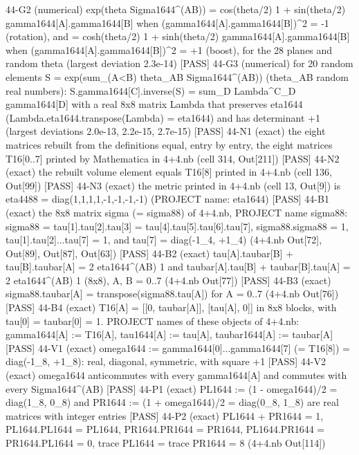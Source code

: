 \documentclass[
  10pt,
]{article}
\newenvironment{Shaded}{}{}
\newcommand{\NormalTok}[1]{#1}
\begin{document}
\begin{Shaded}
\begin{Highlighting}[]
\NormalTok{[PASS] 44{-}G2  (numerical) exp(theta Sigma1644\^{}(AB)) = cos(theta/2) 1 + sin(theta/2) gamma1644[A].gamma1644[B] when (gamma1644[A].gamma1644[B])\^{}2 = {-}1 (rotation), and = cosh(theta/2) 1 + sinh(theta/2) gamma1644[A].gamma1644[B] when (gamma1644[A].gamma1644[B])\^{}2 = +1 (boost), for the 28 planes and random theta (largest deviation 2.3e{-}14)}
\NormalTok{[PASS] 44{-}G3  (numerical) for 20 random elements S = exp(sum\_(A\textless{}B) theta\_AB Sigma1644\^{}(AB)) (theta\_AB random real numbers):  S.gamma1644[C].inverse(S) = sum\_D Lambda\^{}C\_D gamma1644[D] with a real 8x8 matrix Lambda that preserves eta1644 (Lambda.eta1644.transpose(Lambda) = eta1644) and has determinant +1 (largest deviations 2.0e{-}13, 2.2e{-}15, 2.7e{-}15)}
\NormalTok{[PASS] 44{-}N1  (exact) the eight matrices rebuilt from the definitions equal, entry by entry, the eight matrices T16[0..7] printed by Mathematica in 4+4.nb (cell 314, Out[211])}
\NormalTok{[PASS] 44{-}N2  (exact) the rebuilt volume element equals T16[8] printed in 4+4.nb (cell 136, Out[99])}
\NormalTok{[PASS] 44{-}N3  (exact) the metric printed in 4+4.nb (cell 13, Out[9]) is eta4488 = diag(1,1,1,1,{-}1,{-}1,{-}1,{-}1) (PROJECT name: eta1644)}
\NormalTok{[PASS] 44{-}B1  (exact) the 8x8 matrix sigma (= sigma88) of 4+4.nb, PROJECT name sigma88: sigma88 = tau[1].tau[2].tau[3] = tau[4].tau[5].tau[6].tau[7], sigma88.sigma88 = 1, tau[1].tau[2]...tau[7] = 1, and tau[7] = diag({-}1\_4, +1\_4) (4+4.nb Out[72], Out[89], Out[87], Out[63])}
\NormalTok{[PASS] 44{-}B2  (exact) tau[A].taubar[B] + tau[B].taubar[A] = 2 eta1644\^{}(AB) 1 and taubar[A].tau[B] + taubar[B].tau[A] = 2 eta1644\^{}(AB) 1 (8x8), A, B = 0..7 (4+4.nb Out[77])}
\NormalTok{[PASS] 44{-}B3  (exact) sigma88.taubar[A] = transpose(sigma88.tau[A]) for A = 0..7 (4+4.nb Out[76])}
\NormalTok{[PASS] 44{-}B4  (exact) T16[A] = [[0, taubar[A]], [tau[A], 0]] in 8x8 blocks, with tau[0] = taubar[0] = 1.  PROJECT names of these objects of 4+4.nb: gamma1644[A] := T16[A], tau1644[A] := tau[A], taubar1644[A] := taubar[A]}
\NormalTok{[PASS] 44{-}V1  (exact) omega1644 := gamma1644[0]...gamma1644[7] (= T16[8]) = diag({-}1\_8, +1\_8): real, diagonal, symmetric, with square +1}
\NormalTok{[PASS] 44{-}V2  (exact) omega1644 anticommutes with every gamma1644[A] and commutes with every Sigma1644\^{}(AB)}
\NormalTok{[PASS] 44{-}P1  (exact) PL1644 := (1 {-} omega1644)/2 = diag(1\_8, 0\_8) and PR1644 := (1 + omega1644)/2 = diag(0\_8, 1\_8) are real matrices with integer entries}
\NormalTok{[PASS] 44{-}P2  (exact) PL1644 + PR1644 = 1, PL1644.PL1644 = PL1644, PR1644.PR1644 = PR1644, PL1644.PR1644 = PR1644.PL1644 = 0, trace PL1644 = trace PR1644 = 8 (4+4.nb Out[114])}

\end{Highlighting}
\end{Shaded}
\end{document}
